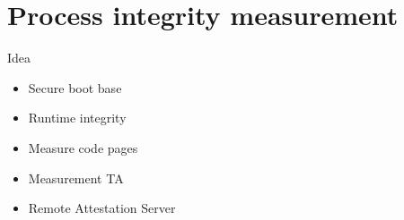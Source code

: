 \documentclass[]{beamer}
\begin{document}
\section{Process integrity measurement}

\begin{frame}{Idea}
\begin{itemize}
\item Secure boot base
\item Runtime integrity 
\item Measure code pages
\item Measurement TA
\item Remote Attestation Server
\end{itemize}
\end{frame}
\end{document}
